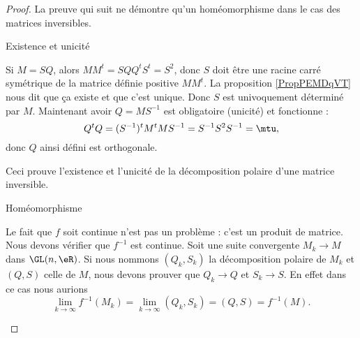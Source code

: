 \begin{proof}
    La preuve qui suit ne démontre qu'un homéomorphisme dans le cas des matrices inversibles.
    \begin{subproof}
        \item[Existence et unicité]

            Si \( M=SQ\), alors \( MM^t=SQQ^tS^t=S^2\), donc \( S\) doit être une racine carré symétrique de la matrice définie positive \( MM^t\). La proposition \ref{PropPEMDqVT} nous dit que ça existe et que c'est unique. Donc \( S\) est univoquement déterminé par \( M\). Maintenant avoir \( Q=MS^{-1}\) est obligatoire (unicité) et fonctionne :
            \begin{equation}
                Q^tQ=(S^{-1})^tM^tMS^{-1}=S^{-1}S^2S^{-1}=\mtu,
            \end{equation}
            donc \( Q\) ainsi défini est orthogonale.

            Ceci prouve l'existence et l'unicité de la décomposition polaire d'une matrice inversible.
        
        \item[Homéomorphisme]

            Le fait que \( f\) soit continue n'est pas un problème : c'est un produit de matrice. Nous devons vérifier que \( f^{-1}\) est continue. Soit une suite convergente \( M_k\to M\) dans \( \GL(n,\eR)\). Si nous nommons \( (Q_k,S_k)\) la décomposition polaire de \( M_k\) et \( (Q,S)\) celle de \( M\), nous devons prouver que \( Q_k\to Q\) et \( S_k\to S\). En effet dans ce cas nous aurions
            \begin{equation}    \label{EqJIkoaJv}
                \lim_{k\to \infty} f^{-1}(M_k)=\lim_{k\to \infty} (Q_k,S_k)=(Q,S)=f^{-1}(M).
            \end{equation}
            

\end{subproof}
\end{proof}
